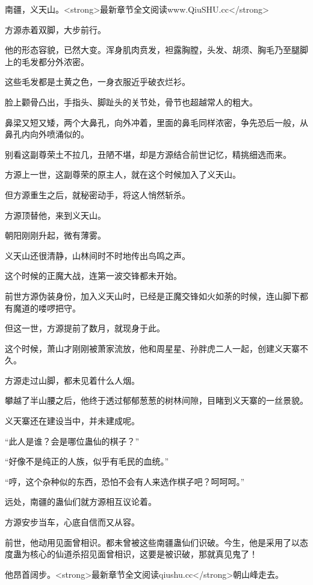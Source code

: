 
\begin{this_body}

南疆，义天山。<strong>最新章节全文阅读www.QiuSHU.cc</strong>

方源赤着双脚，大步前行。

他的形态容貌，已然大变。浑身肌肉贲发，袒露胸膛，头发、胡须、胸毛乃至腿脚上的毛发都分外浓密。

这些毛发都是土黄之色，一身衣服近乎破衣烂衫。

脸上颧骨凸出，手指头、脚趾头的关节处，骨节也超越常人的粗大。

鼻梁又短又矮，两个大鼻孔，向外冲着，里面的鼻毛同样浓密，争先恐后一般，从鼻孔内向外喷涌似的。

别看这副尊荣土不拉几，丑陋不堪，却是方源结合前世记忆，精挑细选而来。

方源上一世，这副尊荣的原主人，就在这个时候加入了义天山。

但方源重生之后，就秘密动手，将这人悄然斩杀。

方源顶替他，来到义天山。

朝阳刚刚升起，微有薄雾。

义天山还很清静，山林间时不时地传出鸟鸣之声。

这个时候的正魔大战，连第一波交锋都未开始。

前世方源伪装身份，加入义天山时，已经是正魔交锋如火如荼的时候，连山脚下都有魔道的喽啰把守。

但这一世，方源提前了数月，就现身于此。

这个时候，萧山才刚刚被萧家流放，他和周星星、孙胖虎二人一起，创建义天寨不久。

方源走过山脚，都未见着什么人烟。

攀越了半山腰之后，他终于透过郁郁葱葱的树林间隙，目睹到义天寨的一丝景貌。

义天寨还在建设当中，并未建成呢。

“此人是谁？会是哪位蛊仙的棋子？”

“好像不是纯正的人族，似乎有毛民的血统。”

“哼，这个杂种似的东西，恐怕不会有人来选作棋子吧？呵呵呵。”

远处，南疆的蛊仙们就方源相互议论着。

方源安步当车，心底自信而又从容。

前世，他动用见面曾相识。都未曾被这些南疆蛊仙们识破。今生，他是采用了以态度蛊为核心的仙道杀招见面曾相识，这要是被识破，那就真见鬼了！

他昂首阔步。<strong>最新章节全文阅读qiushu.cc</strong>朝山峰走去。


\end{this_body}
